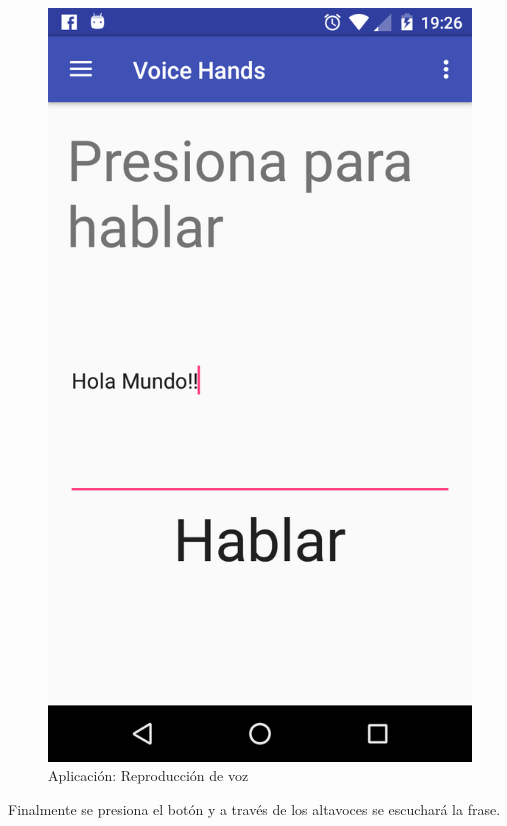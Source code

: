 \begin{figure}[H]
	\centering
	\includegraphics[scale = 0.2]{figures/app08}
	\caption{Aplicación: Reproducción de voz}
	\label{fig:app08}
\end{figure}

Finalmente se presiona el botón y a través de los altavoces se escuchará la frase.

